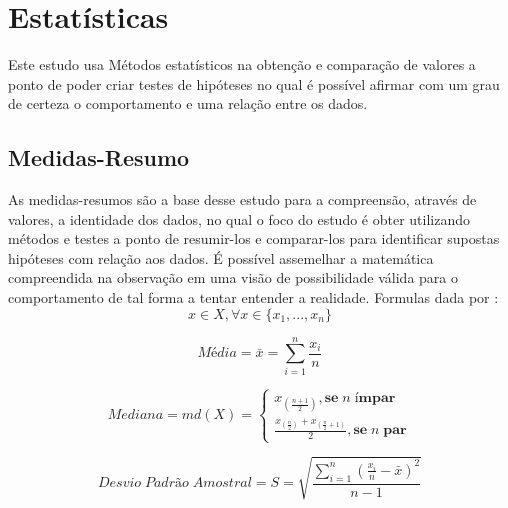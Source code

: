 

\chapter{Estatísticas}
Este estudo usa Métodos estatísticos na obtenção e comparação de valores a ponto de poder criar testes de hipóteses no qual é possível afirmar com um grau de certeza o comportamento e uma relação entre os dados.

\section{Medidas-Resumo}

As medidas-resumos são a base desse estudo para a compreensão, através de valores, a identidade dos dados, no qual o foco do estudo é obter utilizando métodos e testes a ponto de resumir-los e comparar-los para identificar supostas hipóteses com relação aos dados. É possível assemelhar a matemática compreendida na observação em uma visão de possibilidade válida para o comportamento de tal forma a tentar entender a realidade. Formulas dada por {}:
$$x \in X,\forall x \in \{x_1,...,x_n\}$$

\begin{equation}
    Média = \bar{x} = \sum_{i=1}^{n} \frac{x_i}{n}
\end{equation}

\begin{equation}
Mediana = md(X) =\left \{\begin{array}{lll}x_{(\frac{n+1}{2})}, \textbf{se} \; n \; \textbf{ímpar}\\\frac{x_{(\frac{n}{2})} + x_{(\frac{n}{2}+1)}}{2}, \textbf{se} \; n \; \textbf{par}\end{array} \right.
\end{equation}

\begin{equation}
Desvio \; Padrão \; Amostral = S = \sqrt{\frac{\sum_{i=1}^{n} (\frac{x_i}{n} - \bar{x})^2}{n-1}}
\end{equation}


